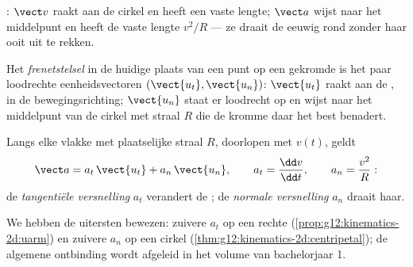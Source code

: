 \begin{omfigure}

{\small {}: $\vect v$ raakt aan de cirkel en heeft
een vaste lengte; $\vect a$ wijst naar het middelpunt en heeft de vaste
lengte $v^2/R$ --- ze draait de  eeuwig rond zonder haar ooit uit
te rekken.}
\end{omfigure}

\begin{definition}[Frenetstelsel]\label{def:g12:kinematics-2d:frenet}
Het \emph{frenetstelsel} in de huidige plaats van een
punt op een gekromde  is het paar loodrechte eenheidsvectoren
$(\vect{u_t}, \vect{u_n})$: $\vect{u_t}$ raakt aan de , in de
bewegingsrichting; $\vect{u_n}$ staat er loodrecht op en wijst naar het
middelpunt van de cirkel met straal $R$ die de kromme daar het best
benadert.
\end{definition}

\begin{proposition}\label{prop:g12:kinematics-2d:frenetacc}
Langs elke vlakke  met plaatselijke straal $R$, doorlopen met 
$v(t)$, geldt
\[
\vect a = a_t\,\vect{u_t} + a_n\,\vect{u_n},
\qquad a_t = \frac{\dd v}{\dd t},
\qquad a_n = \frac{v^2}{R}:
\]
de \emph{tangentiële versnelling} $a_t$
verandert de ; de \emph{normale versnelling} $a_n$ draait haar.
\end{proposition}
\admitted

\begin{remark}\label{rem:g12:kinematics-2d:frenetproof}
We hebben de uitersten bewezen: zuivere $a_t$ op een rechte
(\cref{prop:g12:kinematics-2d:uarm}) en zuivere $a_n$ op een cirkel
(\cref{thm:g12:kinematics-2d:centripetal}); de algemene ontbinding wordt
afgeleid in het volume van bachelorjaar 1.
\end{remark}

